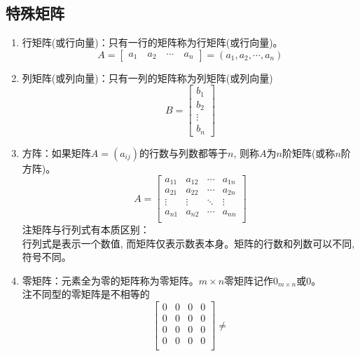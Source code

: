 \subsection{特殊矩阵}
\begin{enumerate}
    \item{行矩阵(或行向量)：只有一行的矩阵称为行矩阵(或行向量)。\\
    $$A=\left[\begin{matrix}
        a_1\quad a_2\quad\cdots\quad a_n
    \end{matrix}
    \right]
    =(a_1,a_2,\cdots,a_n)$$
    }
    \item{列矩阵(或列向量)：只有一列的矩阵称为列矩阵(或列向量)
        $$B=\left[\begin{matrix}
            b_1 \\ b_2 \\ \vdots \\ b_n
        \end{matrix}
            \right]
        $$
    }
    \item{
        方阵：如果矩阵$A=(a_{ij})$的行数与列数都等于$n$, 则称$A$为$n$阶矩阵(或称$n$阶方阵)。
        $$
        A=\left[\begin{matrix}
            {{a}_{11}} & {{a}_{12}} & \cdots  & {{a}_{1n}}  \\
            {{a}_{21}} & {{a}_{22}} & \cdots  & {{a}_{2n}}  \\
            \vdots  & \vdots  & {\ddots} & \vdots   \\
            {{a}_{n1}} & {{a}_{n2}} & \cdots  & {{a}_{nn}}  \\
         \end{matrix} \right]         
        $$
        {\color{red}注\quad}矩阵与行列式有本质区别：\\
        行列式是表示一个数值, 而矩阵仅表示数表本身。矩阵的行数和列数可以不同,符号不同。
    }
    \item{
        零矩阵：元素全为零的矩阵称为零矩阵。$m\times n$零矩阵记作$0_{m\times n}$或$0$。\\
        {\color{red}注\quad}不同型的零矩阵是不相等的
        $$
        \left[\begin{matrix}
            0 & 0 & 0 & 0  \\
            0 & 0 & 0 & 0  \\
            0 & 0 & 0 & 0  \\
            0 & 0 & 0 & 0  \\
         \end{matrix} \right]\ne 
$$}
\end{enumerate}
